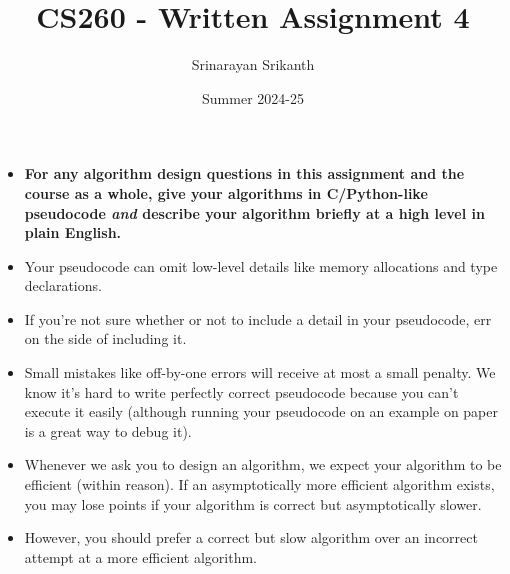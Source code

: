 \documentclass[addpoints]{exam}
\begin{document}
\title{CS260 - Written Assignment 4}
\author{Srinarayan Srikanth}
\date{Summer 2024-25}
\maketitle



\newcommand{\limn}{\lim_{n \to \infty}}

\begin{itemize}
\item {\color{red} \textbf{For any algorithm design questions in this assignment and the course as a whole, give your algorithms in C/Python-like pseudocode \textit{and} describe your algorithm briefly at a high level in plain English.}}
\item Your pseudocode can omit low-level details like memory allocations and type declarations.
\item If you're not sure whether or not to include a detail in your pseudocode, err on the side of including it.
\item Small mistakes like off-by-one errors will receive at most a small penalty. We know it's hard to write perfectly correct pseudocode because you can't execute it easily (although running your pseudocode on an example on paper is a great way to debug it).
\item Whenever we ask you to design an algorithm, we expect your algorithm to be efficient (within reason). If an asymptotically more efficient algorithm exists, you may lose points if your algorithm is correct but asymptotically slower.
\item However, you should prefer a correct but slow algorithm over an incorrect attempt at a more efficient algorithm.
\end{itemize}
\end{document}
